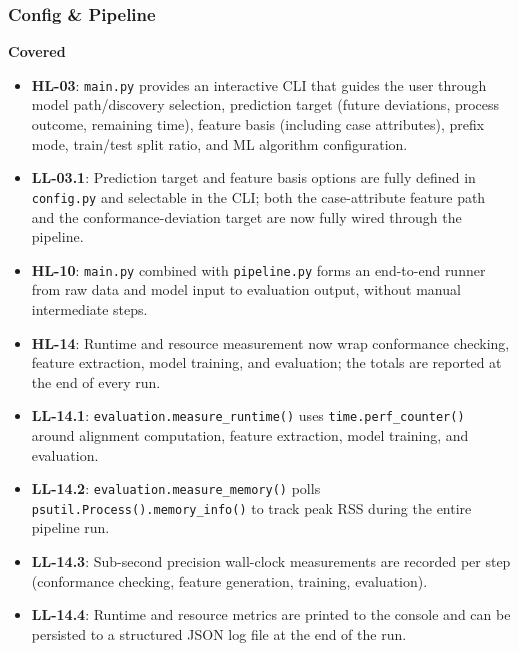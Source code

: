 \documentclass[12pt,a4paper]{article}
\begin{document}
\subsubsection{Config \& Pipeline}

\textbf{Covered}
\begin{itemize}
    \item \textbf{HL-03}: \texttt{main.py} provides an interactive CLI that guides the user through model path/discovery selection, prediction target (future deviations, process outcome, remaining time), feature basis (including case attributes), prefix mode, train/test split ratio, and ML algorithm configuration.
    \item \textbf{LL-03.1}: Prediction target and feature basis options are fully defined in \texttt{config.py} and selectable in the CLI; both the case-attribute feature path and the conformance-deviation target are now fully wired through the pipeline.
    \item \textbf{HL-10}: \texttt{main.py} combined with \texttt{pipeline.py} forms an end-to-end runner from raw data and model input to evaluation output, without manual intermediate steps.
    \item \textbf{HL-14}: Runtime and resource measurement now wrap conformance checking, feature extraction, model training, and evaluation; the totals are reported at the end of every run.
    \item \textbf{LL-14.1}: \texttt{evaluation.measure\_runtime()} uses \texttt{time.perf\_counter()} around alignment computation, feature extraction, model training, and evaluation.
    \item \textbf{LL-14.2}: \texttt{evaluation.measure\_memory()} polls \texttt{psutil.Process().memory\_info()} to track peak RSS during the entire pipeline run.
    \item \textbf{LL-14.3}: Sub-second precision wall-clock measurements are recorded per step (conformance checking, feature generation, training, evaluation).
    \item \textbf{LL-14.4}: Runtime and resource metrics are printed to the console and can be persisted to a structured JSON log file at the end of the run.
\end{itemize}
\end{document}
